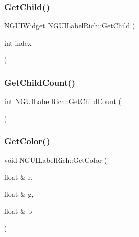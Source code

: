 \subsubsection{\texorpdfstring{Get\+Child()}{GetChild()}\hspace{0.1cm}{\footnotesize\ttfamily [2/2]}}
{\footnotesize\ttfamily N\+G\+U\+I\+Widget N\+G\+U\+I\+Label\+Rich\+::\+Get\+Child (\begin{DoxyParamCaption}\item[{int}]{index }\end{DoxyParamCaption})}

\hypertarget{class_n_g_u_i_label_rich_abbb54952e35bfb90369b87ede9d3bc57}{}\label{class_n_g_u_i_label_rich_abbb54952e35bfb90369b87ede9d3bc57} 
\subsubsection{\texorpdfstring{Get\+Child\+Count()}{GetChildCount()}}
{\footnotesize\ttfamily int N\+G\+U\+I\+Label\+Rich\+::\+Get\+Child\+Count (\begin{DoxyParamCaption}{ }\end{DoxyParamCaption})}

\hypertarget{class_n_g_u_i_label_rich_a2619e4f3e612b2c18ca2ee27ce37552b}{}\label{class_n_g_u_i_label_rich_a2619e4f3e612b2c18ca2ee27ce37552b} 
\subsubsection{\texorpdfstring{Get\+Color()}{GetColor()}}
{\footnotesize\ttfamily void N\+G\+U\+I\+Label\+Rich\+::\+Get\+Color (\begin{DoxyParamCaption}\item[{float \&}]{r,  }\item[{float \&}]{g,  }\item[{float \&}]{b }\end{DoxyParamCaption})}

\hypertarget{class_n_g_u_i_label_rich_aae131d8f53c9c3430b00dee0738b6734}{}\label{class_n_g_u_i_label_rich_aae131d8f53c9c3430b00dee0738b6734} 
